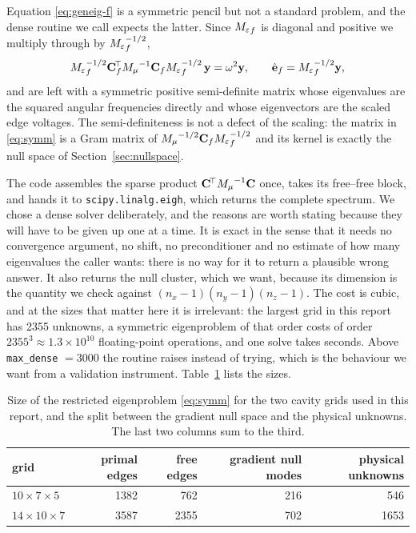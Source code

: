 Equation \eqref{eq:geneig-f} is a symmetric pencil but not a standard problem, and the dense
routine we call
expects the latter. Since ${M_{\varepsilon}}_f$ is diagonal and positive we multiply through by ${M_{\varepsilon}}_f^{-1/2}$,
\begin{equation}
  {M_{\varepsilon}}_f^{-1/2}\mathbf{C}_f^{\!\top}{M_{\mu}}^{-1}\mathbf{C}_f{M_{\varepsilon}}_f^{-1/2}\,\mathbf{y} = \omega^{2}\mathbf{y},
  \qquad \hat{\mathbf{e}}_f={M_{\varepsilon}}_f^{-1/2}\mathbf{y},
  \label{eq:symm}
\end{equation}
and are left with a symmetric positive semi-definite matrix whose eigenvalues are the squared
angular frequencies
directly and whose eigenvectors are the scaled edge voltages. The semi-definiteness is not a defect
of the
scaling: the matrix in \eqref{eq:symm} is a Gram matrix of ${M_{\mu}}^{-1/2}\mathbf{C}_f{M_{\varepsilon}}_f^{-1/2}$ and its
kernel is
exactly the null space of Section~\ref{sec:nullspace}.

The code assembles the sparse product $\mathbf{C}^{\!\top}{M_{\mu}}^{-1}\mathbf{C}$ once, takes its free--free
block, and hands it to \texttt{scipy.linalg.eigh}, which returns the complete spectrum. We chose a
dense solver deliberately, and the reasons are worth stating because they will have to be given up
one at a time. It is exact in the sense that it needs no convergence argument, no shift, no
preconditioner and no estimate of how many eigenvalues the caller wants: there is no way for it to
return a plausible wrong answer. It also returns the null cluster, which we want, because its
dimension is the quantity we check against $(n_x-1)(n_y-1)(n_z-1)$. The cost is cubic, and at the
sizes that matter here it is irrelevant: the largest grid in this report has 2355 unknowns, a
symmetric eigenproblem of that order costs of order $2355^{3}\approx1.3\times10^{10}$ floating-point
operations, and one solve takes seconds. Above \texttt{max\_dense} $=3000$ the routine raises
instead of trying, which is the behaviour we want from a validation instrument.
Table~\ref{tab:sizes} lists the sizes.

\begin{table}[H]
  \centering
  \caption{Size of the restricted eigenproblem \eqref{eq:symm} for the two cavity grids used in
this report, and
  the split between the gradient null space and the physical unknowns. The last two columns sum to
the third.}
  \label{tab:sizes}
  \begin{tabular}{@{}lrrrr@{}}
    \toprule
    grid & primal edges & free edges & gradient null modes & physical unknowns \\
    \midrule
    $10\times7\times5$ & 1382 & 762  & 216 & 546  \\
    $14\times10\times7$ & 3587 & 2355 & 702 & 1653 \\
    \bottomrule
  \end{tabular}
\end{table}

